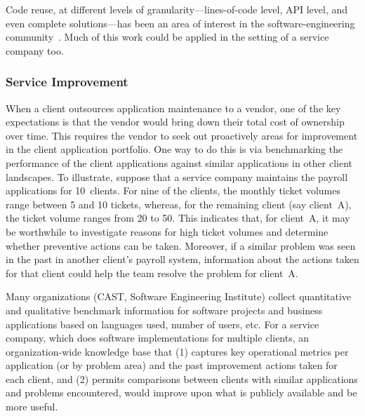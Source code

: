 Code reuse, at different levels of granularity---lines-of-code level, API level,
and even complete solutions---has been an area of interest in the
software-engineering community~\cite{Reiss:2009,Holmes:2013}. Much of this work
could be applied in the setting of a service company too.

\subsubsection{Service Improvement}

When a client outsources application maintenance to a vendor, one of the key
expectations is that the vendor would bring down their total cost of ownership
over time. This requires the vendor to seek out proactively areas for
improvement in the client application portfolio. One way to do this is via
benchmarking the performance of the client applications against similar
applications in other client landscapes. To illustrate, suppose that a service
company maintains the payroll applications for 10~clients. For nine of the
clients, the monthly ticket volumes range between 5 and 10 tickets, whereas, for
the remaining client (say client~A), the ticket volume ranges from 20 to
50. This indicates that, for client~A, it may be worthwhile to investigate
reasons for high ticket volumes and determine whether preventive actions can be
taken. Moreover, if a similar problem was seen in the past in another client's
payroll system, information about the actions taken for that client could help
the team resolve the problem for client~A.

Many organizations (\eg CAST, Software Engineering Institute) collect
quantitative and qualitative benchmark information for software projects and
business applications based on languages used, number of users, etc.  For a
service company, which does software implementations for multiple clients, an
organization-wide knowledge base that (1) captures key operational metrics per
application (or by problem area) and the past improvement actions taken for each
client, and (2) permits comparisons between clients with similar applications
and problems encountered, would improve upon what is publicly available and be
more useful.


